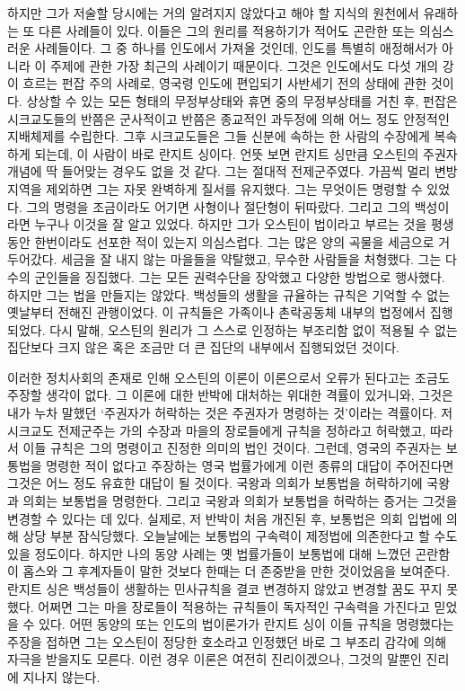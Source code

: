 하지만 
그가 저술할 당시에는 거의 알려지지 않았다고 해야 할 지식의 원천에서 유래하는
또 다른 사례들이 있다.
이들은 그의 원리를 적용하기가 적어도 곤란한 또는 의심스러운 사례들이다.
그 중 하나를 인도에서 가져올 것인데,
인도를 특별히 애정해서가 아니라
이 주제에 관한 가장 최근의 사례이기 때문이다.
그것은 인도에서도
다섯 개의 강이 흐르는
펀잡 주의 사례로,
영국령 인도에 편입되기 사반세기 전의 상태에 관한 것이다.
상상할 수 있는 모든 형태의 무정부상태와 휴면 중의 무정부상태를 거친 후,
펀잡은
시크교도들의
반쯤은 군사적이고 반쯤은 종교적인
과두정에 의해 어느 정도 안정적인 지배체제를 수립한다.
그후 시크교도들은 그들 신분에 속하는 한 사람의 수장에게
복속하게 되는데, 이 사람이 바로 란지트 싱이다.
언뜻 보면 란지트 싱만큼 오스틴의 주권자 개념에
딱 들어맞는 경우도 없을 것 같다.
그는 절대적 전제군주였다.
가끔씩 멀리 변방 지역을 제외하면 그는 자못 완벽하게 질서를 유지했다.
그는 무엇이든 명령할 수 있었다.
그의 명령을 조금이라도 어기면 사형이나 절단형이 뒤따랐다.
그리고 그의 백성이라면 누구나 이것을 잘 알고 있었다.
하지만 그가 오스틴이 법이라고 부르는 것을 평생동안 한번이라도
선포한 적이 있는지 의심스럽다.
그는 많은 양의 곡물을 세금으로 거두어갔다.
세금을 잘 내지 않는 마을들을 약탈했고, 무수한 사람들을 처형했다.
그는 다수의 군인들을 징집했다.
그는 모든 권력수단을 장악했고 다양한 방법으로 행사했다.
하지만 그는 법을 만들지는 않았다.
백성들의 생활을 규율하는 규칙은
기억할 수 없는 옛날부터 전해진 관행이었다.
이 규칙들은 가족이나 촌락공동체 내부의 법정에서 집행되었다.
다시 말해,
오스틴의 원리가 그 스스로 인정하는 부조리함 없이 적용될 수 없는 집단보다
크지 않은 혹은 조금만 더 큰 집단의 내부에서 집행되었던 것이다.

이러한 정치사회의 존재로 인해 오스틴의 이론이 이론으로서 오류가 된다고는
조금도 주장할 생각이 없다.
그 이론에 대한 반박에 대처하는 위대한 격률이 있거니와,
그것은 내가 누차 말했던 `주권자가 허락하는 것은 주권자가 명령하는 것'이라는
격률이다.
저 시크교도 전제군주는 가의 수장과 마을의 장로들에게
규칙을 정하라고 허락했고, 따라서
이들 규칙은 그의 명령이고 진정한 의미의 법인 것이다.
그런데,
영국의 주권자는 보통법을 명령한 적이 없다고 주장하는
영국 법률가에게
이런 종류의 대답이
주어진다면 그것은 어느 정도 유효한 대답이 될 것이다.
국왕과 의회가 보통법을 허락하기에 국왕과 의회는 보통법을 명령한다.
그리고 국왕과 의회가 보통법을 허락하는 증거는 그것을 변경할 수 있다는 데 있다.
실제로, 저 반박이 처음 개진된 후,
보통법은 의회 입법에 의해 상당 부분 잠식당했다.
오늘날에는 보통법의 구속력이 제정법에 의존한다고 할 수도 있을 정도이다.
하지만 나의 동양 사례는
옛 법률가들이 보통법에 대해 느꼈던 곤란함이
홉스와 그 후계자들이 말한 것보다 한때는 더 존중받을 만한 것이었음을 보여준다.
란지트 싱은 백성들이 생활하는 민사규칙을 결코 변경하지 않았고
변경할 꿈도 꾸지 못했다.
어쩌면 그는 마을 장로들이 적용하는 규칙들이
독자적인 구속력을 가진다고 믿었을 수 있다.
어떤 동양의 또는 인도의 법이론가가
란지트 싱이 이들 규칙을 명령했다는 주장을 접하면
그는 오스틴이 정당한 호소라고 인정했던 바로 그 부조리 감각에 의해
자극을 받을지도 모른다.
이런 경우 이론은 여전히 진리이겠으나,
그것의 말뿐인 진리에 지나지 않는다.

